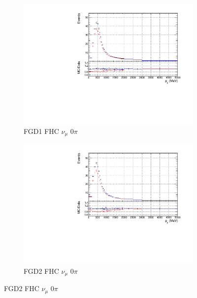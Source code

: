 \begin{figure}[!htbp]
\begin{subfigure}{0.49\textwidth}
  \centering
  \includegraphics[width=\textwidth]{figs/priorpred1D_p_FGD1_numuCC_0pi}
  \caption{FGD1 FHC $\nu_{\mu}$ 0$\pi$}
\end{subfigure}
\begin{subfigure}{0.49\textwidth}
  \centering
  \includegraphics[width=\textwidth]{figs/priorpred1D_p_FGD2_numuCC_0pi}
  \caption{FGD2 FHC $\nu_{\mu}$ 0$\pi$}
\end{subfigure}


\end{figure}
